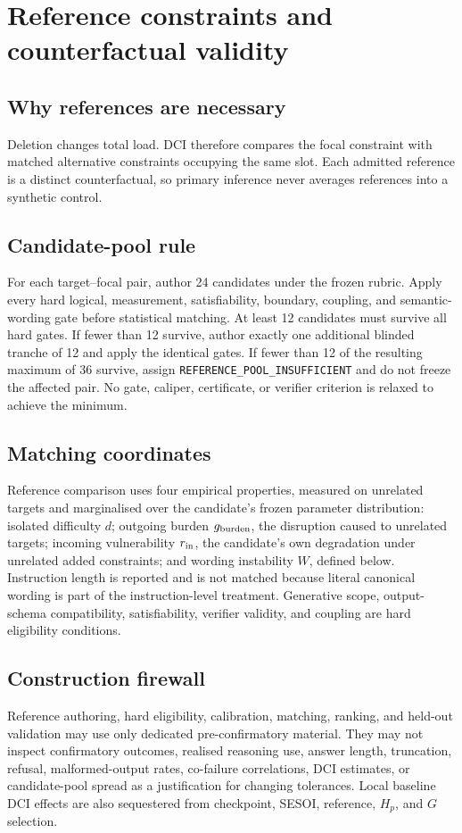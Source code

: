\documentclass[11pt,a4paper]{article}
\newcommand{\REFPOOL}{\nolinkurl{REFERENCE_POOL_INSUFFICIENT}}
\begin{document}
\section{Reference constraints and counterfactual validity}\label{sec:references}

\subsection{Why references are necessary}
Deletion changes total load. DCI therefore compares the focal constraint with matched alternative constraints occupying the same slot. Each admitted reference is a distinct counterfactual, so primary inference never averages references into a synthetic control.

\subsection{Candidate-pool rule}
For each target--focal pair, author 24 candidates under the frozen rubric. Apply every hard logical, measurement, satisfiability, boundary, coupling, and semantic-wording gate before statistical matching. At least 12 candidates must survive all hard gates. If fewer than 12 survive, author exactly one additional blinded tranche of 12 and apply the identical gates. If fewer than 12 of the resulting maximum of 36 survive, assign \REFPOOL{} and do not freeze the affected pair. No gate, caliper, certificate, or verifier criterion is relaxed to achieve the minimum.

\subsection{Matching coordinates}
Reference comparison uses four empirical properties, measured on unrelated targets and marginalised over the candidate's frozen parameter distribution: isolated difficulty $d$; outgoing burden $g_{\rm burden}$, the disruption caused to unrelated targets; incoming vulnerability $r_{\rm in}$, the candidate's own degradation under unrelated added constraints; and wording instability $W$, defined below. Instruction length is reported and is not matched because literal canonical wording is part of the instruction-level treatment. Generative scope, output-schema compatibility, satisfiability, verifier validity, and coupling are hard eligibility conditions.

\subsection{Construction firewall}
Reference authoring, hard eligibility, calibration, matching, ranking, and held-out validation may use only dedicated pre-confirmatory material. They may not inspect confirmatory outcomes, realised reasoning use, answer length, truncation, refusal, malformed-output rates, co-failure correlations, DCI estimates, or candidate-pool spread as a justification for changing tolerances. Local baseline DCI effects are also sequestered from checkpoint, SESOI, reference, $H_p$, and $G$ selection.
\end{document}
